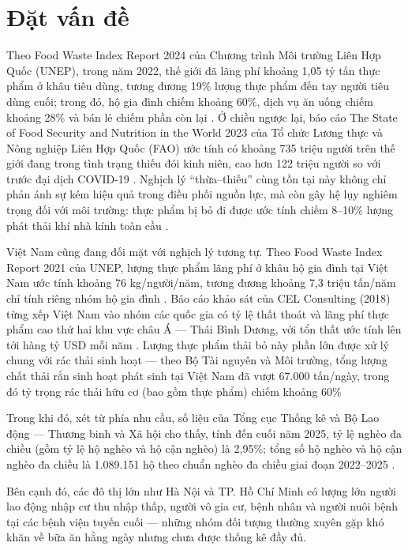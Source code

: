 \documentclass[../main.tex]{subfiles}%
\begin{document}
\setcounter{chapter}{1}
\section{Đặt vấn đề}%
\label{section:1.1}
Theo Food Waste Index Report 2024 của Chương trình Môi trường Liên Hợp Quốc (UNEP), trong năm 2022, thế giới đã lãng phí khoảng 1,05 tỷ tấn thực phẩm ở khâu tiêu dùng, tương đương 19\% lượng thực phẩm đến tay người tiêu dùng cuối; trong đó, hộ gia đình chiếm khoảng 60\%, dịch vụ ăn uống chiếm khoảng 28\% và bán lẻ chiếm phần còn lại \cite{FoodWasteReport2024}. Ở chiều ngược lại, báo cáo The State of Food Security and Nutrition in the World 2023 của Tổ chức Lương thực và Nông nghiệp Liên Hợp Quốc (FAO) ước tính có khoảng 735 triệu người trên thế giới đang trong tình trạng thiếu đói kinh niên, cao hơn 122 triệu người so với trước đại dịch COVID-19 \cite{TheStateofFoodSecurityandNutrition2023}. Nghịch lý ``thừa--thiếu'' cùng tồn tại này không chỉ phản ánh sự kém hiệu quả trong điều phối nguồn lực, mà còn gây hệ lụy nghiêm trọng đối với môi trường: thực phẩm bị bỏ đi được ước tính chiếm 8--10\% lượng phát thải khí nhà kính toàn cầu \cite{FoodWasteReport2024}.

Việt Nam cũng đang đối mặt với nghịch lý tương tự. Theo Food Waste Index Report 2021 của UNEP, lượng thực phẩm lãng phí ở khâu hộ gia đình tại Việt Nam ước tính khoảng 76 kg/người/năm, tương đương khoảng 7,3 triệu tấn/năm chỉ tính riêng nhóm hộ gia đình \cite{FoodWasteReport2021}. Báo cáo khảo sát của CEL Consulting (2018) từng xếp Việt Nam vào nhóm các quốc gia có tỷ lệ thất thoát và lãng phí thực phẩm cao thứ hai khu vực châu Á — Thái Bình Dương, với tổn thất ước tính lên tới hàng tỷ USD mỗi năm \cite{CELConsulting2018}. Lượng thực phẩm thải bỏ này phần lớn được xử lý chung với rác thải sinh hoạt — theo Bộ Tài nguyên và Môi trường, tổng lượng chất thải rắn sinh hoạt phát sinh tại Việt Nam đã vượt 67.000 tấn/ngày, trong đó tỷ trọng rác thải hữu cơ (bao gồm thực phẩm) chiếm khoảng 60\% \cite{BaoTinTuc2024}

Trong khi đó, xét từ phía nhu cầu, số liệu của Tổng cục Thống kê và Bộ Lao động — Thương binh và Xã hội cho thấy, tính đến cuối năm 2025, tỷ lệ nghèo đa chiều (gồm tỷ lệ hộ nghèo và hộ cận nghèo) là 2,95\%; tổng số hộ nghèo và hộ cận nghèo đa chiều là 1.089.151 hộ theo chuẩn nghèo đa chiều giai đoạn 2022–2025 \cite{ThuVienPhapLuat2025}.

Bên cạnh đó, các đô thị lớn như Hà Nội và TP. Hồ Chí Minh có lượng lớn người lao động nhập cư thu nhập thấp, người vô gia cư, bệnh nhân và người nuôi bệnh tại các bệnh viện tuyến cuối — những nhóm đối tượng thường xuyên gặp khó khăn về bữa ăn hằng ngày nhưng chưa được thống kê đầy đủ.
\end{document}
